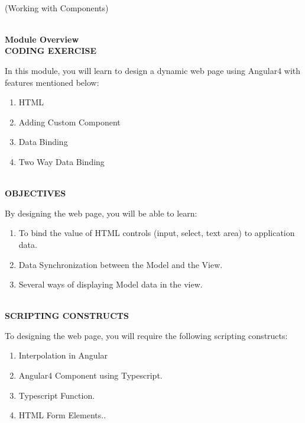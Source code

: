 \documentclass{article}
\begin{document}
\begin{center}
	\noindent \\ {\huge  (Working with Components)}
\end{center}


\noindent 
\\  
{\Large 
\noindent \textbf{Module Overview}}
\\ 

{\normalsize {\large \noindent \textbf{CODING EXERCISE}}}
\\  
\noindent 

\noindent In this module, you will learn to design a dynamic web page using Angular4 with features mentioned below:

\noindent 

\begin{enumerate}
	\item HTML
	\item Adding Custom Component
	\item Data Binding
	\item Two Way Data Binding
	
\end{enumerate}


\noindent 
\\ 
\noindent \textbf{OBJECTIVES}
\\  

\noindent 

\noindent By designing the web page, you will be able to learn:

\noindent 
\begin{enumerate}
	\item To bind the value of HTML controls (input, select, text area) to application data.
	\item  Data Synchronization between the Model and the View.
	\item  Several ways of displaying Model data in the view.  
\end{enumerate}
  

\noindent 
\\  
\noindent \textbf{SCRIPTING CONSTRUCTS}

\noindent 

\noindent To designing the web page, you will require the following scripting constructs: 

\begin{enumerate}
	\item Interpolation in Angular 
	\item Angular4 Component using Typescript.
	\item Typescript Function.   
	\item HTML Form Elements..
\end{enumerate}
\end{document}
